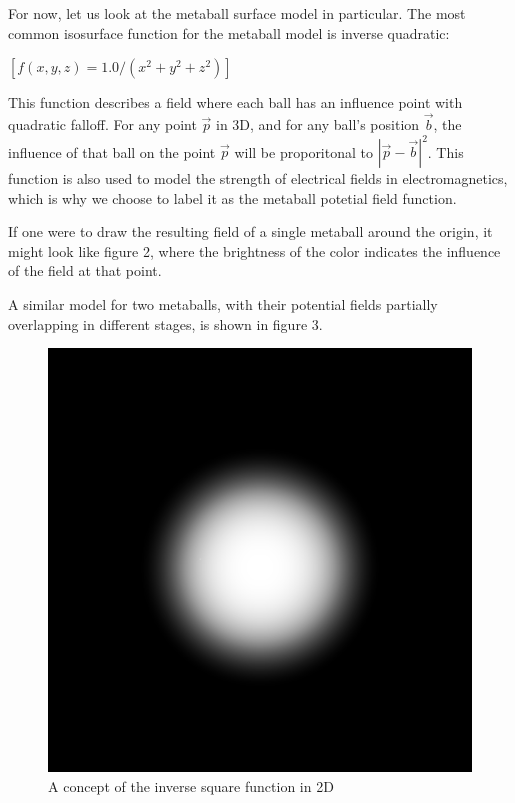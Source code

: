 \documentclass{article}
\begin{document}
\begin{multicols}{2}
            For now, let us look at the metaball surface model in particular. The most common isosurface function for the metaball model is inverse quadratic:

            $[f(x,y,z) = 1.0 / (x^2 + y^2 + z^2)]$

            This function describes a field where each ball has an influence point with quadratic falloff.
            For any point $\vec{p}$ in 3D, and for any ball's position $\vec{b}$, the influence of that ball on the point $\vec{p}$ will be proporitonal to $|\vec{p} - \vec{b}|^2$.
            This function is also used to model the strength of electrical fields in electromagnetics, which is why we choose to label it as the metaball potetial field function.
            \cite{geiss00}

            If one were to draw the resulting field of a single metaball around the origin, it might look like figure 2, where the brightness of the color indicates the influence of the field at that point.
            
            A similar model for two metaballs, with their potential fields partially overlapping in different stages, is shown in figure 3.
            
            \begin{figure}[H]
            	\centering
            	\begin{minipage}[b]{0.2\textwidth}
            		\centering
            		\includegraphics[width=\textwidth]{img/2d-potential.png}
            		\caption{A concept of the inverse square function in 2D}
		            \label{fig:2d-potential}
            	\end{minipage}
            \end{figure}
        

\end{multicols}
\end{document}
